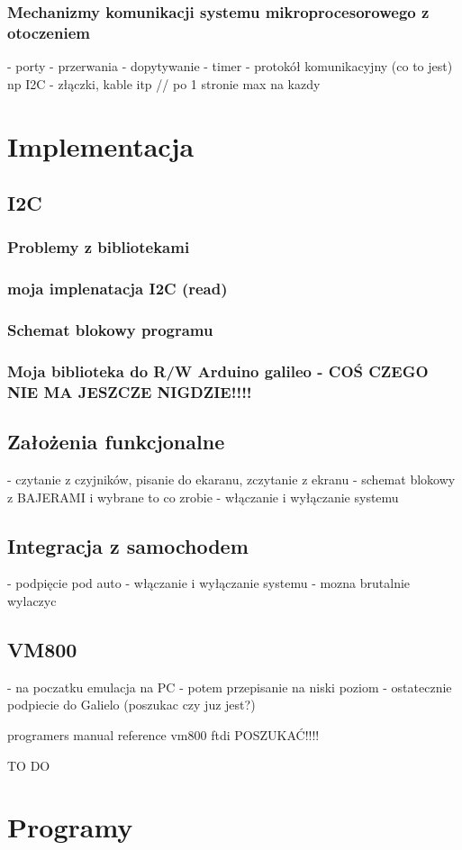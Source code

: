 \documentclass{xmgr}
\begin{document}
\subsection{Mechanizmy komunikacji systemu mikroprocesorowego z otoczeniem}
- porty
- przerwania
- dopytywanie
- timer
- protokół komunikacyjny (co to jest) np I2C
- złączki, kable itp
// po 1 stronie max na kazdy


\chapter{Implementacja}
\section{I2C}
\subsection{Problemy z bibliotekami}
\subsection{moja implenatacja I2C (read)}
\subsection{Schemat blokowy programu}
\subsection{Moja biblioteka do R/W Arduino galileo - COŚ CZEGO NIE MA JESZCZE NIGDZIE!!!!}
\section{Założenia funkcjonalne}
 - czytanie z czyjników, pisanie do ekaranu, zczytanie z ekranu
 - schemat blokowy z BAJERAMI i wybrane to co zrobie
 - włączanie i wyłączanie systemu
\section{Integracja z samochodem}
 - podpięcie pod auto
 - włączanie i wyłączanie systemu - mozna brutalnie wylaczyc
\section{VM800}
  - na poczatku emulacja na PC
  - potem przepisanie na niski poziom
  - ostatecznie podpiecie do Galielo (poszukac czy juz jest?)
  
   programers manual reference vm800 ftdi POSZUKAĆ!!!!

\summary
TO DO

\appendix
\chapter{Programy}




\listoftables

\listoffigures

\oswiadczenie
\end{document}
